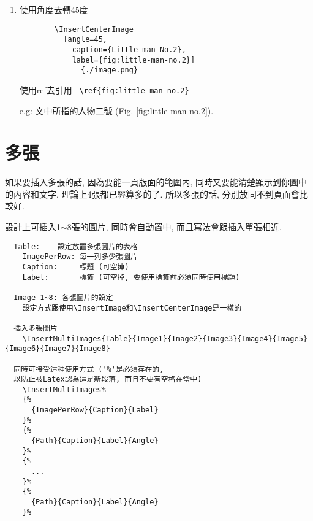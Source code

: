 \begin{enumerate}
{      之後可以使用ref去引用 \verb| \ref{fig:little-man-no.1} |

      e.g: 文中所指的人物一號 (Fig. \ref{fig:little-man-no.1}).
    } %

    \item
    {
      使用角度去轉45度
      \begin{verbatim}
        \InsertCenterImage
          [angle=45,
            caption={Little man No.2},
            label={fig:little-man-no.2}]
              {./image.png}
      \end{verbatim}

      使用ref去引用 \verb| \ref{fig:little-man-no.2} |

      e.g: 文中所指的人物二號 (Fig. \ref{fig:little-man-no.2}).
    } %

  \end{enumerate}

\newpage
\section{多張}

  如果要插入多張的話, 因為要能一頁版面的範圍內, 同時又要能清楚顯示到你圖中的內容和文字, 理論上4張都已經算多的了. 所以多張的話, 分別放同不到頁面會比較好.

  設計上可插入1$\sim$8張的圖片, 同時會自動置中, 而且寫法會跟插入單張相近.

  \begin{framed}
  \begin{verbatim}
  Table:    設定放置多張圖片的表格
    ImagePerRow: 每一列多少張圖片
    Caption:     標題 (可空掉)
    Label:       標簽 (可空掉, 要使用標簽前必須同時使用標題)

  Image 1~8: 各張圖片的設定
    設定方式跟使用\InsertImage和\InsertCenterImage是一樣的

  插入多張圖片
    \InsertMultiImages{Table}{Image1}{Image2}{Image3}{Image4}{Image5}{Image6}{Image7}{Image8}

  同時可接受這種使用方式 ('%'是必須存在的,
  以防止被Latex認為這是新段落, 而且不要有空格在當中)
    \InsertMultiImages%
    {%
      {ImagePerRow}{Caption}{Label}
    }%
    {%
      {Path}{Caption}{Label}{Angle}
    }%
    {%
      ...
    }%
    {%
      {Path}{Caption}{Label}{Angle}
    }%
  \end{verbatim}
  \end{framed}

